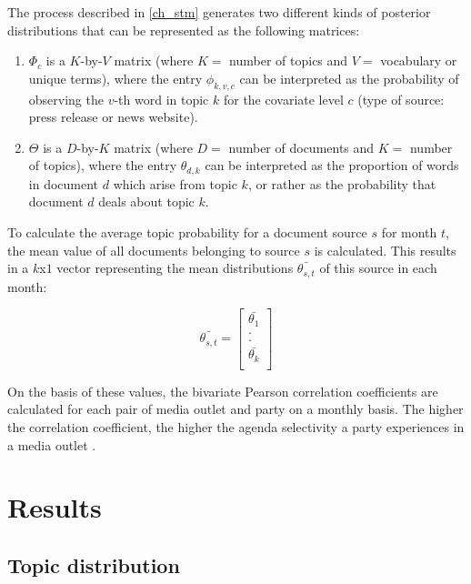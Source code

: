 \documentclass[12pt,a4paper,notitlepage]{article}
\begin{document}
The process described in \ref{ch_stm} generates two different kinds of posterior distributions that can be represented as the following matrices: 

\begin{enumerate}
	\item $\Phi_c$ is a $K$-by-$V$ matrix (where $K=$ number of topics and $V=$ vocabulary or unique terms), where the entry $\phi_{k,v,c}$ can be interpreted as the probability of observing the $v$-th word in topic $k$ for the covariate level $c$ (type of source: press release or news website). 
	\item $\Theta$ is a $D$-by-$K$ matrix (where $D=$ number of documents and $K=$ number of topics), where the entry $\theta_{d,k}$ can be interpreted as the proportion of words in document $d$ which arise from topic $k$, or rather as the probability that document $d$ deals about topic $k$. 
\end{enumerate}

To calculate the average topic probability for a document source $s$ for month $t$, the mean value of all documents belonging to source $s$ is calculated. This results in a $k$x$1$ vector representing the mean distributions $\bar{ \theta_{s,t} }$ of this source in each month:

\begin{equation}
	\bar{ \theta_{s,t} } =
	\begin{bmatrix} 
	\bar{ \theta_{1} } \\
	. \\
	. \\
	\bar{ \theta_{k} } \\
	\end{bmatrix}
\end{equation} 

On the basis of these values, the bivariate Pearson correlation coefficients are calculated for each pair of media outlet and party  on a monthly basis. The higher the correlation coefficient, the higher the agenda selectivity a party experiences in a media outlet \citep{eberl_one_2017, brandenburg_political_2005}.


\section{Results}

\subsection{Topic distribution} 
\end{document}
